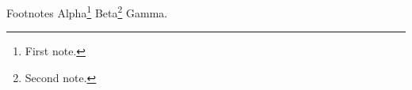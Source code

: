 \documentclass[aspectratio=169]{beamer}
\begin{document}
\begin{frame}{Footnotes}
Alpha\footnote{First note.} Beta\footnote{Second note.} Gamma.
\end{frame}
\end{document}

